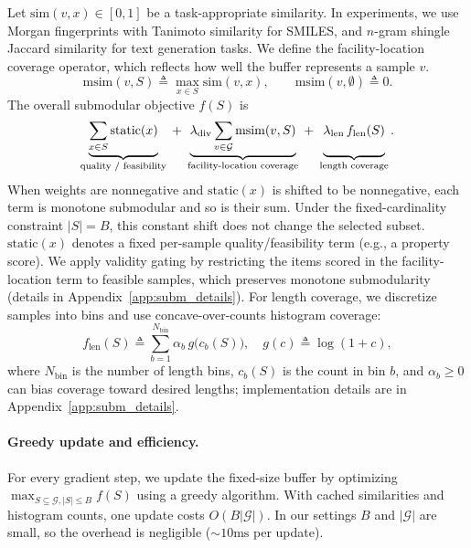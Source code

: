 \documentclass{article}
\theoremstyle{plain}
\theoremstyle{definition}
\theoremstyle{remark}
\begin{document}
Let $\mathrm{sim}(v,x)\in[0,1]$ be a task-appropriate similarity.
In experiments, we use Morgan fingerprints with Tanimoto similarity for SMILES, and $n$-gram shingle Jaccard similarity for text generation tasks.
We define the facility-location coverage operator, which reflects how well the buffer represents a sample $v$. 
\begin{equation}
\label{eq:msim_cov}
\mathrm{msim}(v,S)\triangleq \max_{x\in S}\mathrm{sim}(v,x),
\qquad \mathrm{msim}(v,\emptyset)\triangleq 0.
\end{equation}
The overall submodular objective $f(S)$ is
\begin{equation}
\label{eq:setfunc}
\begin{aligned}
\underbrace{\sum_{x\in S}\mathrm{static}(x)}_{\text{quality / feasibility}}
\;+\;
\underbrace{\lambda_{\mathrm{div}} \sum_{v\in \mathcal{G}} \mathrm{msim}(v,S)}_{\text{facility-location coverage}}
\;+\;
\underbrace{\vphantom{\sum_{u\in \mathcal{G}}}\lambda_{\mathrm{len}}\, f_{\mathrm{len}}(S)}_{\text{length coverage}}.
\end{aligned}
\end{equation}
When weights are nonnegative and $\mathrm{static}(x)$ is shifted to be nonnegative, each term is monotone submodular and so is their sum. Under the fixed-cardinality constraint $|S|=B$, this constant shift does not change the selected subset. $\mathrm{static}(x)$ denotes a fixed per-sample quality/feasibility term (e.g., a property score).
We apply validity gating by restricting the items scored in the facility-location term to feasible samples, which preserves monotone submodularity (details in Appendix~\ref{app:subm_details}).
For length coverage, we discretize samples into bins and use concave-over-counts histogram coverage:
\begin{equation}
\label{eq:lencover}
f_{\mathrm{len}}(S) \triangleq \sum_{b=1}^{N_{\mathrm{bin}}} \alpha_b \, g\big(c_b(S)\big),
\quad
g(c)\triangleq \log(1+c),
\end{equation}
where $N_{\mathrm{bin}}$ is the number of length bins, $c_b(S)$ is the count in bin $b$, and $\alpha_b\!\ge\!0$ can bias coverage toward desired lengths; implementation details are in Appendix~\ref{app:subm_details}.

\paragraph{Greedy update and efficiency.}
For every gradient step, we update the fixed-size buffer by optimizing $\max_{S\subseteq \mathcal{G}, |S| \leq B} f(S)$ using a greedy algorithm.
With cached similarities and histogram counts, one update costs $O(B|\mathcal{G}|)$. In our settings $B$ and $|\mathcal{G}|$ are small, so the overhead is negligible ($\sim 10\mathrm{ms}$ per update).
\end{document}
